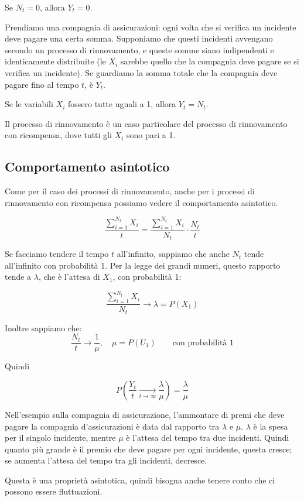 \documentclass[a4paper,12pt]{book}
\begin{document}
Se $ N_t = 0 $, allora $ Y_t = 0 $. 

Prendiamo una compagnia di assicurazioni: ogni volta che si verifica un incidente deve pagare una certa somma. Supponiamo che questi incidenti avvengano secondo un processo di rinnovamento, e queste somme siano indipendenti e identicamente distribuite (le $ X_i $ sarebbe quello che la compagnia deve pagare se si verifica un incidente). Se guardiamo la somma totale che la compagnia deve pagare fino al tempo $ t $, è $ Y_t $.

Se le variabili $ X_i $ fossero tutte uguali a 1, allora $ Y_t = N_t $.

Il processo di rinnovamento è un caso particolare del processo di rinnovamento con ricompensa, dove tutti gli $ X_i $ sono pari a 1. 

\subsection{Comportamento asintotico}
Come per il caso dei processi di rinnovamento, anche per i processi di rinnovamento con ricompensa possiamo vedere il comportamento asintotico.

$$ \frac{\sum_{i=1}^{N_t} X_i}{t} = \frac{\sum_{i=1}^{N_t} X_i}{N_t} \cdot \frac{N_t}{t} $$

Se facciamo tendere il tempo $ t $ all'infinito, sappiamo che anche $ N_t $ tende all'infinito con probabilità 1. Per la legge dei grandi numeri, questo rapporto tende a $\lambda$, che è l'attesa di $ X_1 $, con probabilità 1: 

$$  \frac{\sum_{i=1}^{N_t} X_i}{N_t} \to \lambda = P(X_1) $$

Inoltre sappiamo che:
$$ \frac{N_t}{t} \to \frac{1}{\mu}, \quad \mu= P(U_1) \qquad \text{con probabilità 1}$$

Quindi

$$ P(\frac{Y_t}{t} \underset{t \to \infty}{\longrightarrow} \frac{\lambda}{\mu}) = \frac{\lambda}{\mu} $$

Nell'esempio sulla compagnia di assicurazione, l'ammontare di premi che deve pagare la compagnia d'assicurazioni è data dal rapporto tra $\lambda$ e $ \mu $. $\lambda$ è la spesa per il singolo incidente, mentre $\mu$ è l'attesa del tempo tra due incidenti. Quindi quanto più grande è il premio che deve pagare per ogni incidente, questa cresce; se aumenta l'attesa del tempo tra gli incidenti, decresce. 

Questa è una proprietà asintotica, quindi bisogna anche tenere conto che ci possono essere fluttuazioni.
\end{document}
